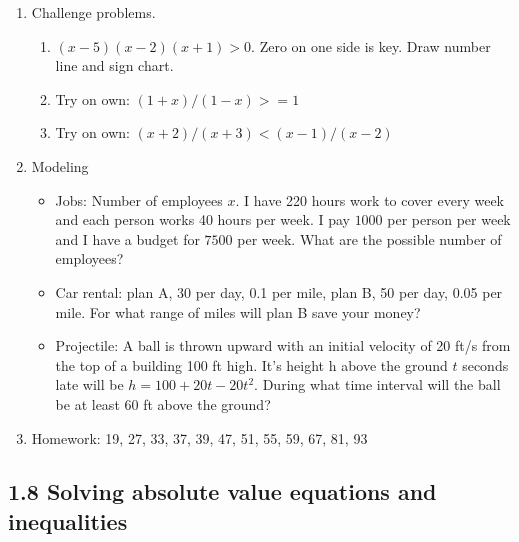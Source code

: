 \documentclass{article}
\begin{document}
\begin{enumerate}
\item Challenge problems.
\begin{enumerate}
\item $(x-5)(x-2)(x+1) > 0$. Zero on one side is key. Draw number line and sign chart.
\item Try on own: $(1+x)/(1-x) >= 1$
\item Try on own: $(x+2)/(x+3) < (x-1)/(x-2)$
\end{enumerate}

\item Modeling
\begin{itemize}
\item Jobs: Number of employees $x$. I have 220 hours work to cover every week and each person works 40 hours per week. I pay $1000$ per person per week and I have a budget for $7500$ per week. What are the possible number of employees?
\item Car rental: plan A, 30 per day, 0.1 per mile, plan B, 50 per day, 0.05 per mile. For what range of miles will plan B save your money?
\item Projectile: A ball is thrown upward with an initial velocity of 20 ft/s from the top of a building 100 ft high. It's height h above the ground $t$ seconds late will be $h = 100 + 20t-20t^2$. During what time interval will the ball be at least 60 ft above the ground?
\end{itemize}

\item Homework: 19, 27, 33, 37, 39, 47, 51, 55, 59, 67, 81, 93
\end{enumerate}

\subsection{1.8 Solving absolute value equations and inequalities}
\end{document}
